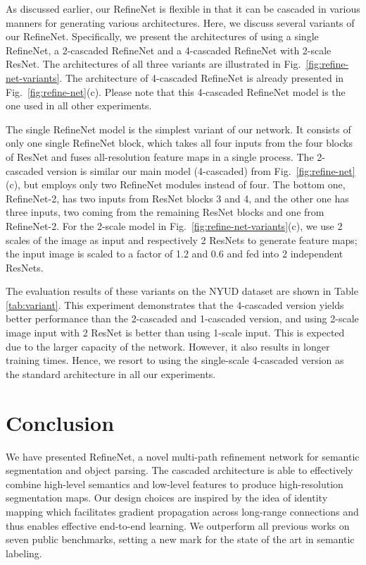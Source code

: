 \documentclass[10pt,twocolumn,letterpaper]{article}
\newcommand{\Fig}{Fig.\xspace}
\newcommand{\refOurFig}{\ref{fig:refine-net}(c)\xspace}
\begin{document}
As discussed earlier, our RefineNet is flexible in that it can be cascaded in various manners for generating various architectures.
Here, we discuss several variants of our RefineNet. Specifically, we present the architectures of using
a single RefineNet, a 2-cascaded RefineNet and a 4-cascaded RefineNet with 2-scale ResNet.
The architectures of all three variants are illustrated in Fig.~\ref{fig:refine-net-variants}.
The architecture of 4-cascaded RefineNet is already presented in \Fig~\refOurFig. 
Please note that this 4-cascaded RefineNet model is the one used in all other experiments.

The single RefineNet model is the simplest variant of our network. It consists of only one single RefineNet block, which takes all four inputs from the four blocks of ResNet and fuses all-resolution feature maps in a single process.  
The 2-cascaded version is similar our main model (4-cascaded) from \Fig~\refOurFig, but employs only two RefineNet modules instead of four. The bottom one, RefineNet-2, has two inputs from ResNet blocks 3 and 4, and the other one has three inputs, two coming from the remaining ResNet blocks and one from RefineNet-2.
For the 2-scale model in Fig.~\ref{fig:refine-net-variants}(c), we use 2 scales of the image as input and respectively 2 ResNets to generate feature maps;
the input image is scaled to a factor of 1.2 and 0.6 and fed into 2 independent ResNets. 


The evaluation results of these variants on the NYUD dataset are shown in Table \ref{tab:variant}. 
This experiment demonstrates that the 4-cascaded version yields better performance than the 2-cascaded and 1-cascaded version, and using 2-scale image input with 2 ResNet is better than using 1-scale input. This is expected due to the larger capacity of the network. However, it also results in longer training times. Hence, we resort to using the single-scale 4-cascaded version as the standard architecture in all our experiments.


\section{Conclusion}\label{sec:conclusion}

We have presented RefineNet, a novel multi-path refinement network  for semantic segmentation and object parsing. The cascaded architecture is able to effectively combine high-level semantics and low-level features to produce high-resolution segmentation maps. 
Our design choices are inspired by the idea of identity mapping which facilitates gradient propagation across long-range connections and thus enables effective end-to-end learning.
We outperform all previous works on seven public benchmarks, setting a new mark for the state of the art in semantic labeling. 
\end{document}
